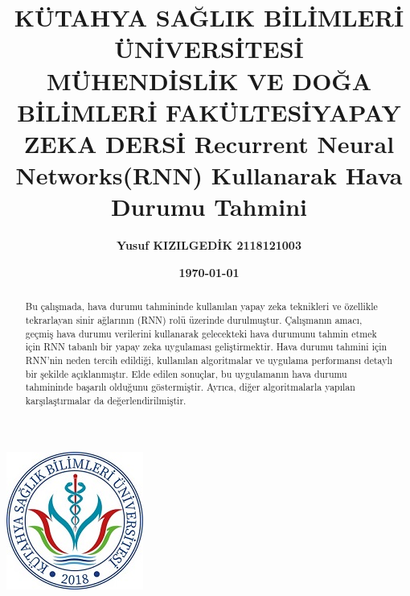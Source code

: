 \documentclass[12pt,a4paper]{article}
\title{\bf\fontsize{12pt}{14pt}\selectfont KÜTAHYA SAĞLIK BİLİMLERİ ÜNİVERSİTESİ \\ MÜHENDİSLİK VE DOĞA BİLİMLERİ FAKÜLTESİ}
\date{}
\begin{document}
	
	\maketitle
	\begin{center}
			\includegraphics[width=0.25\linewidth]{ksbu.png}
	\end{center}
             
	        
	\begin{center}
		\vspace{1cm} 
	\end{center}
	\begin{center}
	\title{\bf\fontsize{12pt}{14pt}\selectfont YAPAY ZEKA DERSİ }
	\end{center}
		\begin{center}
		\title{\bf\fontsize{12pt}{14pt}\selectfont Recurrent Neural Networks(RNN) Kullanarak Hava Durumu Tahmini}
	\end{center}
	\begin{center}
	\vspace{1cm} %
	\end{center}
	\begin{center}
		
	
	\author{\bf\fontsize{12pt}{14pt}Yusuf KIZILGEDİK \hspace{1.5cm}2118121003}
	
	\begin{center}
	\vspace{1cm} 
	\end{center}
	\date{\textbf{\today}}
	\end{center}
\newpage
 \begin{abstract}
Bu çalışmada, hava durumu tahmininde kullanılan yapay zeka teknikleri ve özellikle tekrarlayan sinir ağlarının (RNN) rolü üzerinde durulmuştur. Çalışmanın amacı, geçmiş hava durumu verilerini kullanarak gelecekteki hava durumunu tahmin etmek için RNN tabanlı bir yapay zeka uygulaması geliştirmektir. Hava durumu tahmini için RNN'nin neden tercih edildiği, kullanılan algoritmalar ve uygulama performansı detaylı bir şekilde açıklanmıştır. Elde edilen sonuçlar, bu uygulamanın hava durumu tahmininde başarılı olduğunu göstermiştir. Ayrıca, diğer algoritmalarla yapılan karşılaştırmalar da değerlendirilmiştir.
\end{abstract}
\end{document}
